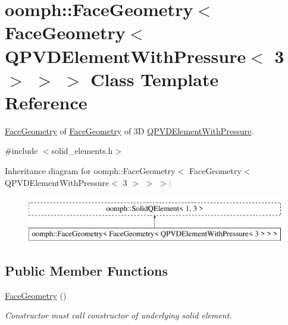 \hypertarget{classoomph_1_1FaceGeometry_3_01FaceGeometry_3_01QPVDElementWithPressure_3_013_01_4_01_4_01_4}{}\section{oomph\+:\+:Face\+Geometry$<$ Face\+Geometry$<$ Q\+P\+V\+D\+Element\+With\+Pressure$<$ 3 $>$ $>$ $>$ Class Template Reference}
\label{classoomph_1_1FaceGeometry_3_01FaceGeometry_3_01QPVDElementWithPressure_3_013_01_4_01_4_01_4}


\hyperlink{classoomph_1_1FaceGeometry}{Face\+Geometry} of \hyperlink{classoomph_1_1FaceGeometry}{Face\+Geometry} of 3D \hyperlink{classoomph_1_1QPVDElementWithPressure}{Q\+P\+V\+D\+Element\+With\+Pressure}.  




{\ttfamily \#include $<$solid\+\_\+elements.\+h$>$}

Inheritance diagram for oomph\+:\+:Face\+Geometry$<$ Face\+Geometry$<$ Q\+P\+V\+D\+Element\+With\+Pressure$<$ 3 $>$ $>$ $>$\+:\begin{figure}[H]
\begin{center}
\leavevmode
\includegraphics[height=2.000000cm]{classoomph_1_1FaceGeometry_3_01FaceGeometry_3_01QPVDElementWithPressure_3_013_01_4_01_4_01_4}
\end{center}
\end{figure}
\subsection*{Public Member Functions}
\begin{DoxyCompactItemize}
\item 
\hyperlink{classoomph_1_1FaceGeometry_3_01FaceGeometry_3_01QPVDElementWithPressure_3_013_01_4_01_4_01_4_a0e123fcd52796dcbfb88b7ac5e238229}{Face\+Geometry} ()
\begin{DoxyCompactList}\small\item\em Constructor must call constructor of underlying solid element. \end{DoxyCompactList}\end{DoxyCompactItemize}


